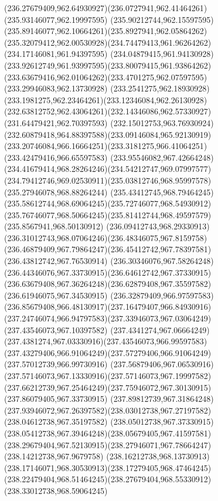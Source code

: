 {{		\curveto(236.27679409,962.64930927)(236.0727941,962.41464261)(235.93146077,962.19997595)
		\curveto(235.90212744,962.15597595)(235.89146077,962.10664261)(235.8927941,962.05864262)
		\curveto(235.32079412,962.00530928)(234.74479413,961.96264262)(234.17146081,961.94397595)
		\curveto(234.04879415,961.94130928)(233.92612749,961.93997595)(233.80079415,961.93864262)
		\curveto(233.63679416,962.01064262)(233.4701275,962.07597595)(233.29946083,962.13730928)
		\curveto(233.2541275,962.18930928)(233.1981275,962.23464261)(233.12346084,962.26130928)
		\curveto(232.63812752,962.43064261)(232.14346086,962.57330927)(231.64479421,962.70397593)
		\curveto(232.15012753,963.76930924)(232.60879418,964.88397588)(233.09146084,965.92130919)
		\curveto(233.20746084,966.16664251)(233.3181275,966.41064251)(233.42479416,966.65597583)
		\curveto(233.95546082,967.42664248)(234.41679414,968.28264246)(234.54212747,969.07997577)
		\curveto(234.79412746,969.02530911)(235.03812746,968.95997578)(235.27946078,968.88264244)
		\curveto(235.43412745,968.79464245)(235.58612744,968.69064245)(235.72746077,968.54930912)
		\curveto(235.76746077,968.50664245)(235.81412744,968.49597579)(235.8567941,968.50130912)
		\curveto(236.09412743,968.29330913)(236.31012743,968.07064246)(236.48346075,967.8159758)
		\curveto(236.46879409,967.79864247)(236.45412742,967.78397581)(236.43812742,967.76530914)
		\curveto(236.30346076,967.58264248)(236.44346076,967.33730915)(236.64612742,967.37330915)
		\curveto(236.63679408,967.36264248)(236.62879408,967.35597582)(236.61946075,967.34530915)
		\curveto(236.32879409,966.97597583)(236.85679408,966.48130917)(237.16479407,966.84930916)
		\curveto(237.24746074,966.94797583)(237.33946073,967.03064249)(237.43546073,967.10397582)
		\curveto(237.4341274,967.06664249)(237.4381274,967.03330916)(237.43546073,966.99597583)
		\curveto(237.43279406,966.91064249)(237.57279406,966.91064249)(237.57012739,966.99730916)
		\curveto(237.56879406,967.06530916)(237.57146073,967.13330916)(237.57146073,967.19997582)
		\curveto(237.66212739,967.25464249)(237.75946072,967.30130915)(237.86079405,967.33730915)
		\lineto(237.89812739,967.31864248)
		\curveto(237.93946072,967.26397582)(238.03012738,967.27197582)(238.04612738,967.35197582)
		\curveto(238.05012738,967.37330915)(238.05412738,967.39464248)(238.05679405,967.41597581)
		\curveto(238.29679404,967.52130915)(238.27946071,967.78664247)(238.14212738,967.9679758)
		\curveto(238.16212738,968.13730913)(238.17146071,968.30530913)(238.17279405,968.47464245)
		\curveto(238.22479404,968.51464245)(238.27679404,968.55330912)(238.33012738,968.59064245)
}}
